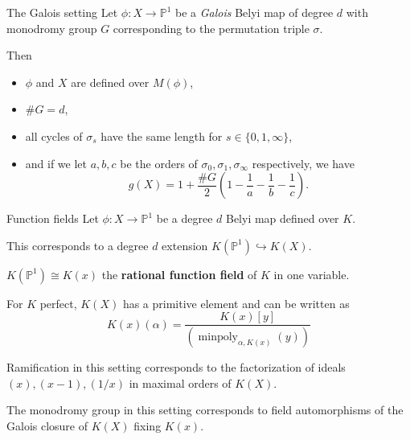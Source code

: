 \documentclass[xcolor=dvipsnames,handout]{beamer}
\theoremstyle{plain}
\newcommand{\PP}{\mathbb P}
\DeclareMathOperator{\minpoly}{minpoly}
\begin{document}
{    \begin{frame}{The Galois setting}
      Let $\phi\colon X\to\PP^1$ be a
      \emph{Galois} Belyi map of degree $d$
      with monodromy group $G$
      corresponding to the permutation triple
      $\sigma$.
      \pause\par
      Then
      \begin{itemize}
        \item
          $\phi$ and $X$ are defined over $M(\phi)$,
        \item
          $\#G = d$,
        \item
          all cycles of $\sigma_s$ have the same
          length for $s\in\{0,1,\infty\}$,
        \item
          and if we let $a,b,c$ be the orders
          of $\sigma_0,\sigma_1,\sigma_\infty$
          respectively,
          we have
          \[
            g(X) = 1+\frac{\#G}{2}
            \left(
              1-\frac{1}{a}
              -\frac{1}{b}
              -\frac{1}{c}
            \right).
          \]
      \end{itemize}
    \end{frame}
    \begin{frame}{Function fields}
      Let $\phi\colon X\to\PP^1$ be
      a degree $d$ Belyi map defined over $K$.
      \pause\par
      This corresponds to a degree $d$
      extension
      $K(\PP^1)\hookrightarrow K(X)$.
      \pause\par
      $K(\PP^1)\cong K(x)$
      the
      \textbf{rational function field}
      of $K$ in one variable.
      \pause\par
      For $K$ perfect,
      $K(X)$ has a primitive element
      and can be written as
      \[
        K(x)(\alpha) = \frac{K(x)[y]}{(\minpoly_{\alpha,K(x)}(y))}
      \]
      \pause\par
      Ramification in this setting corresponds
      to the factorization of ideals
      $(x),(x-1),(1/x)$
      in maximal orders of $K(X)$.
      \pause\par
      The monodromy group in this setting
      corresponds to field automorphisms
      of the Galois closure of $K(X)$
      fixing $K(x)$.
    \end{frame}
  }
\end{document}
